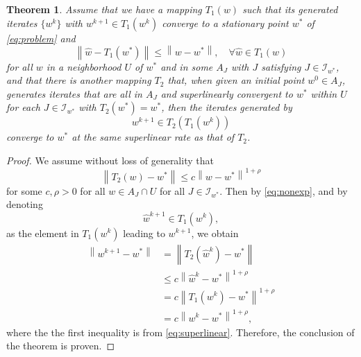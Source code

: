 \documentclass[10pt,a4paper]{amsart}
\newtheorem{theorem}{Theorem}
\newcommand{\I}{\mathcal{I}}
\newcommand{\norm}[1]{{\left\|{#1}\right\|}}
\begin{document}
\begin{theorem}
\label{thm:superlinear}
Assume that we have a mapping $T_1(w)$ such that its generated
iterates $\{w^k\}$ with $w^{k+1} \in T_1(w^k)$ converge to a
stationary point $w^*$ of \cref{eq:problem} and
\begin{equation}
	\norm{\hat w - T_1(w^*)} \leq \norm{w - w^*}, \quad
	\forall \hat w \in T_1 \left( w \right)
	\label{eq:nonexp}
\end{equation}
for all $w$ in a neighborhood $U$ of $w^*$ and in some $A_J$ with $J$
satisfying $J \in \I_{w^*}$,
and that there is another mapping $T_2$ that, when given an initial
point $w^0 \in A_J$, generates iterates that are all in $A_J$ and
superlinearly convergent to $w^*$ within $U$ for each $J \in
\I_{w^*}$ with $T_2(w^*) = w^*$, then the iterates generated by
\begin{equation}
	w^{k+1} \in T_2\left(T_1\left(w^{k}\right)\right)
	\label{eq:seq}
\end{equation}
converge to $w^*$ at the same superlinear rate as that of $T_2$.
\end{theorem}

\begin{proof}
We assume without loss of generality that
\begin{equation}
	\norm{T_2(w) - w^*} \leq c \norm{w - w^*}^{1+\rho}
	\label{eq:superlinear}
\end{equation}
for some $c, \rho > 0$ for all $w \in A_J \cap U$ for all $J \in
\I_{w^*}$.
Then by \cref{eq:nonexp}, and by denoting
\[
	\hat w^{k+1} \in T_1(w^k),
\]
as the element in $T_1(w^k)$ leading to $w^{k+1}$,
we obtain
\begin{align*}
	\norm{w^{k+1} - w^*} &= \norm{T_2 \left(\hat w^k  \right) -
	w^*}\\
	&\leq  c \norm{\hat w^k - w^*}^{1+\rho}\\
	&= c \norm{T_1(w^k) - w^*}^{1+\rho} \\
	&= c \norm{w^k - w^*}^{1+\rho},
\end{align*}
where the the first inequality is from \cref{eq:superlinear}.
Therefore, the conclusion of the theorem is proven.	
\end{proof}
\end{document}
